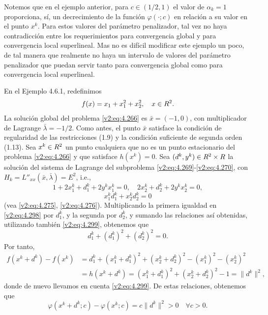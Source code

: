 Notemos que en el ejemplo anterior, para $c \in (1/2, 1)$ el valor de $\alpha_k = 1$ proporciona, sí, un decrecimiento de la función $\varphi(\cdot; c)$ en relación a su valor en el punto $x^k$. Para estos valores del parámetro penalizador, tal vez no haya contradicción entre los requerimientos para convergencia global y para convergencia local superlineal. Mas no es difícil modificar este ejemplo un poco, de tal manera que realmente no haya un intervalo de valores del parámetro penalizador que puedan servir tanto para convergencia global como para convergencia local superlineal.

\begin{example}\label{v2:exa:4.6.2}
    En el Ejemplo 4.6.1, redefinimos
    \[
        f(x) = x_1 + x_1^2 + x_2^2, \quad x \in R^2.
    \]
    La solución global del problema \eqref{v2:eq:4.266} es $\bar{x} = (-1, 0)$, con multiplicador de Lagrange $\bar{\lambda} = -1/2$. Como antes, el punto $\bar{x}$ satisface la condición de regularidad de las restricciones (1.9) y la condición suficiente de segunda orden (1.13).
    Sea $x^k \in R^2$ un punto cualquiera que no es un punto estacionario del problema \eqref{v2:eq:4.266} y que satisface $h(x^k) = 0$. Sea $(d^k, y^k) \in R^2 \times R$ la solución del sistema de Lagrange del subproblema \eqref{v2:eq:4.269}-\eqref{v2:eq:4.270}, con $H_k = L''_{xx}(\bar{x}, \bar{\lambda}) = E^2$, i.e.,
    \begin{equation}
        1 + 2x_1^k + d_1^k + 2y^k x_1^k = 0, \quad 2x_2^k + d_2^k + 2y^k x_2^k = 0, \label{v2:eq:4.298}
    \end{equation}
    \begin{equation}
        x_1^k d_1^k + x_2^k d_2^k = 0 \label{v2:eq:4.299}
    \end{equation}
    (vea \eqref{v2:eq:4.275}, \eqref{v2:eq:4.276}).
    Multiplicando la primera igualdad en \eqref{v2:eq:4.298} por $d_1^k$, y la segunda por $d_2^k$, y sumando las relaciones así obtenidas, utilizando también \eqref{v2:eq:4.299}, obtenemos que
    \[
        d_1^k + (d_1^k)^2 + (d_2^k)^2 = 0.
    \]
    Por tanto,
    \begin{align*}
        f(x^k + d^k) - f(x^k) &= d_1^k + (x_1^k + d_1^k)^2 + (x_2^k + d_2^k)^2 - (x_1^k)^2 - (x_2^k)^2 \\
        &= h(x^k + d^k) = (x_1^k + d_1^k)^2 + (x_2^k + d_2^k)^2 - 1 = \|d^k\|^2,
    \end{align*}
    donde de nuevo llevamos en cuenta \eqref{v2:eq:4.299}. De estas relaciones, obtenemos que
    \[
        \varphi(x^k + d^k; c) - \varphi(x^k; c) = c\|d^k\|^2 > 0 \quad \forall c > 0.
    \]
\end{example}

